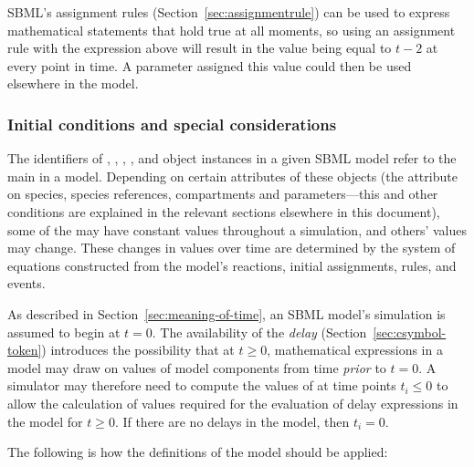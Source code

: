 SBML's assignment rules (Section~\ref{sec:assignmentrule}) can be
used to express mathematical statements that hold true at all
moments, so using an assignment rule with the expression above
will result in the value being equal to $t - 2$ at every point in
time.  A parameter assigned this value could then be used
elsewhere in the model.


\subsubsection{Initial conditions and special considerations}
\label{sec:before-t0}

The identifiers of \Species, \SpeciesReference, \Compartment, \Parameter, and
\Reaction object instances in a given SBML model refer to the main
 in a model.  Depending on certain attributes of these
objects (\eg the attribute  on species, species references, compartments
and parameters---this and other conditions are explained in the
relevant sections elsewhere in this document), some of the
 may have constant values throughout a simulation, and
others' values may change.  These changes in values over time are
determined by the system of equations constructed from the model's
reactions, initial assignments, rules, and events.

As described in Section~\ref{sec:meaning-of-time}, an SBML model's
simulation is assumed to begin at $t = 0$.  The availability of
the \emph{delay}  (Section~\ref{sec:csymbol-token})
introduces the possibility that at $t \geq 0$, mathematical
expressions in a model may draw on values of model components from
time \emph{prior} to $t = 0$.  A simulator may therefore need to
compute the values of  at time points $t_i \leq 0$ to
allow the calculation of values required for the evaluation of
delay expressions in the model for $t \geq 0$.  If there are no
delays in the model, then $t_i = 0$.

The following is how the definitions of the model should be
applied:


